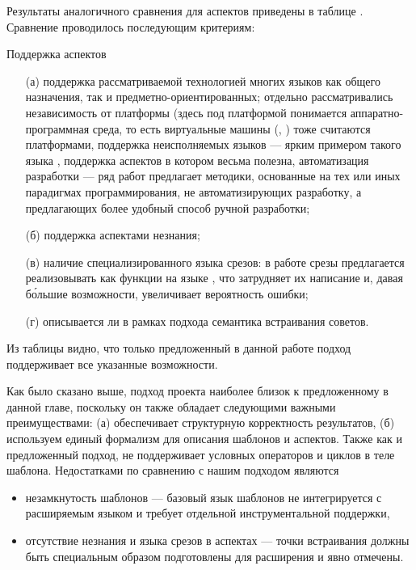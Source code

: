 Результаты аналогичного сравнения для аспектов приведены в таблице .  Сравнение проводилось последующим критериям:
\begin{table}[htb]
	\centering
\newcommand{\dissonly}[1]{#1}

	\caption{Поддержка аспектов}\label{AspTable}
\end{table}
\begin{itemize}
	\item[(а)] поддержка рассматриваемой технологией многих языков как общего назначения, так и предметно-ориентированных; отдельно рассматривались 
		независимость от платформы (здесь под платформой понимается аппаратно-программная среда, то есть виртуальные машины (, ) тоже считаются платформами,
		поддержка неисполняемых языков --- ярким примером такого языка \GRM{}, поддержка аспектов в котором весьма полезна,
		автоматизация разработки --- ряд работ предлагает методики, основанные на тех или иных парадигмах программирования, не автоматизирующих разработку, а предлагающих более удобный способ ручной разработки;
	\item[(б)] поддержка аспектами незнания;
	\item[(в)] наличие специализированного языка срезов: в работе \cite{VanWyk03} срезы предлагается реализовывать как функции на языке , что затрудняет их написание и, давая б\'{о}льшие возможности, увеличивает вероятность ошибки;
	\item[(г)] описывается ли в рамках подхода семантика встраивания советов.
\end{itemize}
Из таблицы видно, что только предложенный в данной работе подход поддерживает все указанные возможности.

Как было сказано выше, подход проекта  \cite{???} наиболее близок к предложенному в данной главе, поскольку он также обладает следующими важными преимуществами:
(а) обеспечивает структурную корректность результатов, (б) используем единый формализм для описания шаблонов и аспектов. Также как и предложенный подход,  не поддерживает условных операторов и циклов в теле шаблона. Недостатками  по сравнению с нашим подходом являются 
\begin{itemize}
\item незамкнутость шаблонов --- базовый язык шаблонов не интегрируется с расширяемым языком и требует отдельной инструментальной поддержки,
\item отсутствие незнания и языка срезов в аспектах --- точки встраивания должны быть специальным образом подготовлены для расширения и явно отмечены.
\end{itemize}

